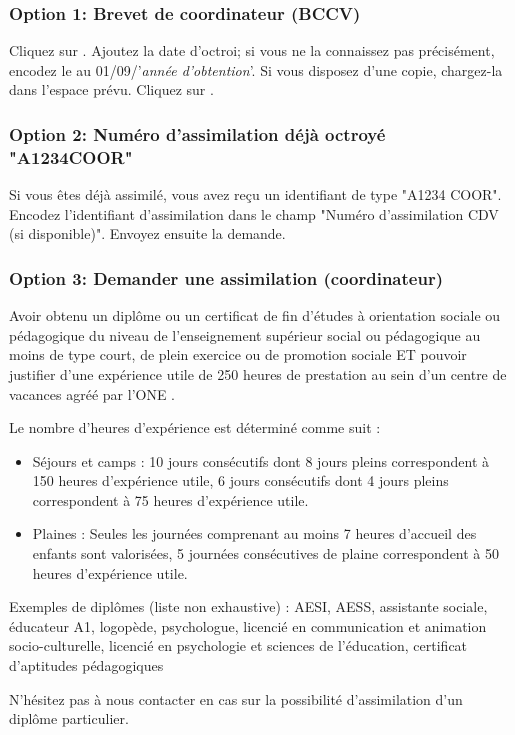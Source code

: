 \subsubsection{Option 1: Brevet de coordinateur (BCCV)}
Cliquez sur . Ajoutez la date d'octroi; si vous ne la connaissez pas précisément, encodez le au 01/09/'\textit{année d'obtention}'. Si vous disposez d'une copie, chargez-la dans l'espace prévu. Cliquez sur . 
\subsubsection{Option 2: Numéro d'assimilation déjà octroyé "A1234COOR"}
Si vous êtes déjà assimilé, vous avez reçu un identifiant de type "A1234 COOR". Encodez l'identifiant d'assimilation dans le champ "Numéro d'assimilation CDV (si disponible)". Envoyez ensuite la demande. 


\subsubsection{Option 3: Demander une assimilation (coordinateur)}

\vspace*{2mm}
\begin{tcolorbox}[title=Quelles sont les conditions d'assimilation (Coordinateur) ? ]
Avoir obtenu un diplôme ou un certificat de fin d'études à orientation sociale ou pédagogique du niveau de l’enseignement supérieur social ou pédagogique au moins de type court, de plein exercice ou de promotion sociale ET pouvoir justifier d’une expérience utile de 250 heures de prestation au sein d’un centre de vacances agréé par l’ONE .

\begin{info}
Le nombre d'heures d'expérience est déterminé comme suit :
\begin{itemize}
    \item Séjours et camps : 10 jours consécutifs dont 8 jours pleins correspondent à 150 heures d'expérience utile, 6 jours consécutifs dont 4 jours pleins correspondent à 75 heures d'expérience utile.
    \item Plaines : Seules les journées comprenant au moins 7 heures d'accueil des enfants sont valorisées, 5 journées consécutives de plaine correspondent à 50 heures d'expérience utile.
\end{itemize}
\end{info}

Exemples de diplômes (liste non exhaustive) : AESI, AESS, assistante sociale, éducateur A1, logopède, psychologue, licencié en communication et animation socio-culturelle, licencié en psychologie et sciences de l’éducation, certificat d’aptitudes pédagogiques

N’hésitez pas à nous contacter en cas sur la possibilité d’assimilation d’un diplôme particulier. 

\end{tcolorbox}

